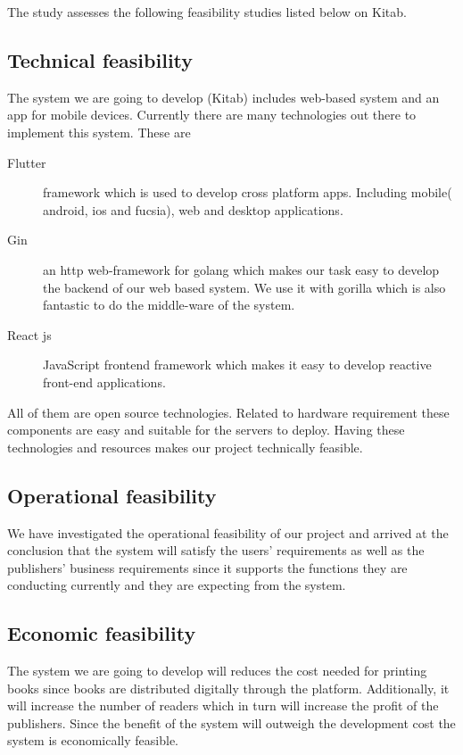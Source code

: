 \bigskip

The study assesses the following feasibility studies listed below on Kitab.

	\subsection{Technical feasibility}
The system we are going to develop (Kitab) includes web-based system and an app for mobile devices. Currently there are many technologies out there to implement this system.
These are

	\begin{description}
	\item[Flutter] framework which is used to develop cross platform apps. Including mobile( android, ios and fucsia), web and desktop applications.
	\item[Gin] an http web-framework for golang which makes our task easy to develop the backend of our web based system. We use it with gorilla which is also fantastic to do the middle-ware of the system.
	\item[React js] JavaScript frontend framework which makes it easy to develop reactive front-end applications.
	\end{description}

All of them are open source technologies. Related to hardware requirement these components are easy and suitable for the servers to deploy. Having these technologies and resources makes our project technically feasible.

	\subsection{Operational feasibility}
We have investigated the operational feasibility of our project and arrived at the conclusion that the system will satisfy the users’ requirements as well as the publishers’ business requirements since it supports the functions they are conducting currently and they are expecting from the system.

	\subsection{Economic feasibility}
The system we are going to develop will reduces the cost needed for printing books since books are distributed digitally through the platform. Additionally, it will increase the number of readers which in turn will increase the profit of the publishers. Since the benefit of the system will outweigh the development cost the system is economically feasible.

